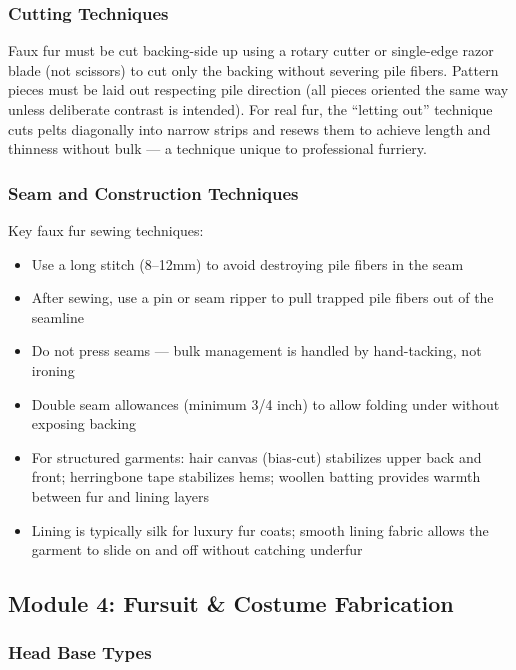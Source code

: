 \documentclass[11pt,letterpaper]{article}
\begin{document}
\subsubsection{Cutting Techniques}

Faux fur must be cut backing-side up using a rotary cutter or single-edge razor blade (not scissors) to cut only the backing without severing pile fibers. Pattern pieces must be laid out respecting pile direction (all pieces oriented the same way unless deliberate contrast is intended). For real fur, the ``letting out'' technique cuts pelts diagonally into narrow strips and resews them to achieve length and thinness without bulk --- a technique unique to professional furriery.

\subsubsection{Seam and Construction Techniques}

Key faux fur sewing techniques:
\begin{itemize}[noitemsep]
  \item Use a long stitch (8--12mm) to avoid destroying pile fibers in the seam
  \item After sewing, use a pin or seam ripper to pull trapped pile fibers out of the seamline
  \item Do not press seams --- bulk management is handled by hand-tacking, not ironing
  \item Double seam allowances (minimum 3/4 inch) to allow folding under without exposing backing
  \item For structured garments: hair canvas (bias-cut) stabilizes upper back and front; herringbone tape stabilizes hems; woollen batting provides warmth between fur and lining layers
  \item Lining is typically silk for luxury fur coats; smooth lining fabric allows the garment to slide on and off without catching underfur
\end{itemize}

\subsection{Module 4: Fursuit \& Costume Fabrication}

\subsubsection{Head Base Types}
\end{document}
